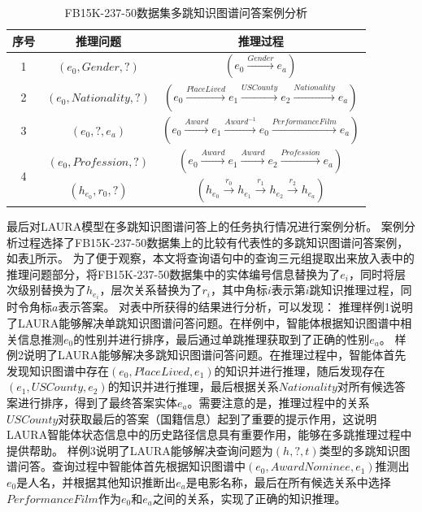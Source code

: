 \documentclass[algorithmlist, AutoFakeBold, AutoFakeSlant, figurelist, tablelist, nomlist, engineering]{seuthesix}
\begin{document}
\begin{table}[t]
  \centering
  \begin{tabular*}{0.95\textwidth}{@{\extracolsep{\fill}}ccc}
  \toprule[1pt] 
  序号 & 推理问题 & 推理过程 \\ \hline
  1 & $(e_0, Gender, ?)$ & $(e_0 \xrightarrow{Gender} e_a)$ \\
  2 & $(e_0, Nationality, ?)$ & $(e_0 \xrightarrow{PlaceLived} e_1 \xrightarrow{USCounty} e_2 \xrightarrow{Nationality} e_a)$ \\
  3 & $(e_0, ?, e_a)$ & $(e_0 \xrightarrow{Award} e_1 \xrightarrow{Award^{-1}} e_0 \xrightarrow{PerformanceFilm} e_a) $ \\
  \multirow{2}{*}{4} & $(e_0, Profession, ?)$ & $(e_0 \xrightarrow{Award} e_1 \xrightarrow{Award} e_2 \xrightarrow{Profession} e_a)$ \\
  & $(h_{e_0}, r_0, ?)$ & $(h_{e_0} \xrightarrow{r_0} h_{e_1} \xrightarrow{r_1} h_{e_2} \xrightarrow{r_2} h_{e_a})$ \\
  \bottomrule[1pt]
  \end{tabular*}
  \caption{FB15K-237-50数据集多跳知识图谱问答案例分析}
  \label{Experiment2_CaseStudy}
\end{table}
最后对LAURA模型在多跳知识图谱问答上的任务执行情况进行案例分析。
案例分析过程选择了FB15K-237-50数据集上的比较有代表性的多跳知识图谱问答案例，如表\ref{Experiment2_CaseStudy}所示。
为了便于观察，本文将查询语句中的查询三元组提取出来放入表中的推理问题部分，将FB15K-237-50数据集中的实体编号信息替换为了$e_i$，同时将层次级别替换为了$h_{e_i}$，层次关系替换为了$r_i$，其中角标$i$表示第$i$跳知识推理过程，同时令角标$a$表示答案。
对表中所获得的结果进行分析，可以发现：
推理样例1说明了LAURA能够解决单跳知识图谱问答问题。在样例中，智能体根据知识图谱中相关信息推测$e_0$的性别并进行排序，最后通过单跳推理获取到了正确的性别$e_a$。
样例2说明了LAURA能够解决多跳知识图谱问答问题。在推理过程中，智能体首先发现知识图谱中存在$(e_0, PlaceLived, e_1)$的知识并进行推理，随后发现存在$(e_1, USCounty, e_2)$的知识并进行推理，最后根据关系$Nationality$对所有候选答案进行排序，得到了最终答案实体$e_a$。需要注意的是，推理过程中的关系$USCounty$对获取最后的答案（国籍信息）起到了重要的提示作用，这说明LAURA智能体状态信息中的历史路径信息具有重要作用，能够在多跳推理过程中提供帮助。
样例3说明了LAURA能够解决查询问题为$(h, ?, t)$类型的多跳知识图谱问答。查询过程中智能体首先根据知识图谱中$(e_0, AwardNominee, e_1)$推测出$e_0$是人名，并根据其他知识推断出$e_a$是电影名称，最后在所有候选关系中选择$PerformanceFilm$作为$e_0$和$e_a$之间的关系，实现了正确的知识推理。
\end{document}
